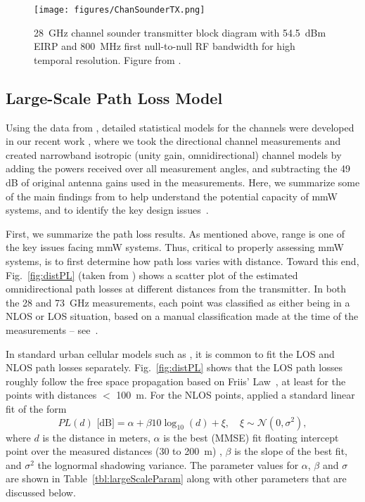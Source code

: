 \documentclass[journal]{IEEEtran}
\def\beq{\begin{equation}}
\def\eeq{\end{equation}}
\begin{document}
\begin{figure}
\begin{center}
    \texttt{[image: figures/ChanSounderTX.png]}
\end{center}
\caption{28~GHz channel sounder transmitter block diagram with 54.5~dBm EIRP and
800~MHz first null-to-null RF bandwidth for high temporal resolution.
Figure from \cite{Rappaport:12-28G}.
}
\label{fig:ChanSoundTX}
\end{figure}

\subsection{Large-Scale Path Loss Model}

Using the data from
\cite{ben2011millimeter,Rappaport:12-28G,Rappaport:28NYCPenetrationLoss,Samimi:AoAD,Nie72G-PIMRC:13,Rappaport:13-BBmmW,rappaportmillimeter},
detailed statistical models for the channels were developed in our recent work
\cite{AkLiuRanRapEr:13-arxiv},
where we took the directional channel measurements and created narrowband
isotropic (unity gain, omnidirectional)
channel models by adding the powers received over all measurement angles,
and subtracting the 49 dB of original antenna gains used in the measurements.
Here, we summarize some of the main findings from \cite{AkLiuRanRapEr:13-arxiv}
to help understand the potential capacity of mmW systems, and to
identify the key design issues~\cite{Rappaport:13-BBmmW}.

First, we summarize the path loss results.
As mentioned above, range is one of the key issues facing mmW systems.
Thus, critical to properly assessing mmW systems, is to first determine how
path loss varies with distance.  Toward this end, Fig.~\ref{fig:distPL}
(taken from \cite{AkLiuRanRapEr:13-arxiv})
shows a scatter plot of the estimated omnidirectional path losses
at different distances from the transmitter.    In both the 28 and 73~GHz measurements,
each point was classified as either being in a NLOS or LOS situation,
based on a manual classification made at the time of the measurements --
see~\cite{ben2011millimeter,Rappaport:12-28G,Rappaport:28NYCPenetrationLoss,Samimi:AoAD,Nie72G-PIMRC:13,Rappaport:13-BBmmW,rappaportmillimeter}.

In standard urban cellular models such as \cite{3GPP36.814}, it is
common to fit the LOS and NLOS path losses separately.
Fig.~\ref{fig:distPL} shows that the LOS path losses roughly follow
the free space propagation based on Friis' Law~\cite{Rappaport:02},
at least for the points with distances $<$ 100~m.
For the NLOS points, \cite{AkLiuRanRapEr:13-arxiv} applied
a standard linear fit of the form
\beq \label{eq:plLin}
    PL(d) \mbox{ [dB]} = \alpha + \beta 10\log_{10}(d) + \xi, \quad \xi \sim {\mathcal N}(0,\sigma^2),
\eeq
where $d$ is the distance in meters, $\alpha$ is the best (MMSE) fit floating intercept
point over the measured distances (30 to 200~m) \cite{Rappaport-72GHz:13},
$\beta$ is the slope of the best fit, and
$\sigma^2$ the lognormal shadowing variance.  The parameter values for
$\alpha$, $\beta$ and $\sigma$ are shown in Table~\ref{tbl:largeScaleParam} along with
other parameters that are discussed below.
\end{document}
